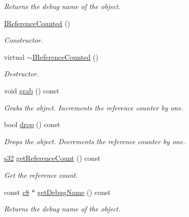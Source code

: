 \begin{DoxyCompactItemize}
\begin{DoxyCompactList}\small\item\em Returns the debug name of the object. \end{DoxyCompactList}\item 
\mbox{\label{classirr_1_1IReferenceCounted_a8411682018e68a2752d4c82675c71040}} 
\hyperlink{classirr_1_1IReferenceCounted_a8411682018e68a2752d4c82675c71040}{I\+Reference\+Counted} ()
\begin{DoxyCompactList}\small\item\em Constructor. \end{DoxyCompactList}\item 
\mbox{\label{classirr_1_1IReferenceCounted_a78abc75801cbb13d9db0955b3c07251c}} 
virtual \hyperlink{classirr_1_1IReferenceCounted_a78abc75801cbb13d9db0955b3c07251c}{$\sim$\+I\+Reference\+Counted} ()
\begin{DoxyCompactList}\small\item\em Destructor. \end{DoxyCompactList}\item 
void \hyperlink{classirr_1_1IReferenceCounted_a396f9cdbe311ada278626477b3c6f0f5}{grab} () const
\begin{DoxyCompactList}\small\item\em Grabs the object. Increments the reference counter by one. \end{DoxyCompactList}\item 
bool \hyperlink{classirr_1_1IReferenceCounted_a03856a09355b89d178090c4a5f738543}{drop} () const
\begin{DoxyCompactList}\small\item\em Drops the object. Decrements the reference counter by one. \end{DoxyCompactList}\item 
\hyperlink{namespaceirr_ac66849b7a6ed16e30ebede579f9b47c6}{s32} \hyperlink{classirr_1_1IReferenceCounted_ae9836f102c33c68068e74292e0a01819}{get\+Reference\+Count} () const
\begin{DoxyCompactList}\small\item\em Get the reference count. \end{DoxyCompactList}\item 
const \hyperlink{namespaceirr_a9395eaea339bcb546b319e9c96bf7410}{c8} $\ast$ \hyperlink{classirr_1_1IReferenceCounted_ad336c6e3c975e4c7911a606c27b894f0}{get\+Debug\+Name} () const
\begin{DoxyCompactList}\small\item\em Returns the debug name of the object. \end{DoxyCompactList}\end{DoxyCompactItemize}
